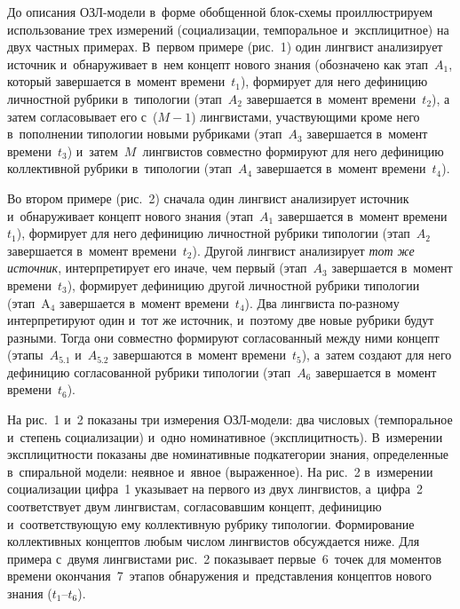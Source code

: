 {\begin{multicols}{2}
  До описания ОЗЛ-мо\-де\-ли в~форме обобщенной блок-схе\-мы 
проиллюстрируем использование трех измерений (социализации, темпоральное и~эксплицитное) на двух частных примерах. В~первом примере (рис.~1) один 
лингвист анализирует источник и~обнаруживает в~нем концепт нового знания 
(обозначено как этап~$A_1$, который завершается в~момент времени~$t_1$), 
формирует для него дефиницию личностной рубрики в~типологии (этап~$A_2$ 
завершается в~момент времени~$t_2$), а затем согласовывает его с~($M-1$) 
лингвистами, участвующими кроме него в~пополнении типологии новыми 
рубриками (этап~$A_3$ завершается в~момент времени~$t_3$) 
и~затем~$M$~лингвистов совместно формируют для него дефиницию 
коллективной рубрики в~типологии (этап~$A_4$ завершается в~момент 
времени~$t_4$).
  


  Во втором примере (рис.~2) сначала один лингвист анализирует источник 
и~обнаруживает концепт нового знания (этап~$A_1$ завершается в~момент 
времени~$t_1$), формирует для него дефиницию личностной рубрики 
типологии (этап~$A_2$ завершается в~момент времени~$t_2$). Другой лингвист 
анализирует \textit{тот же источник}, интерпретирует его иначе, чем первый 
(этап~$A_3$ завершается в~момент времени~$t_3$), формирует дефиницию другой 
личностной рубрики типологии (этап~A$_4$ завершается в~момент 
времени~$t_4$). Два лингвиста по-раз\-но\-му интерпретируют один и~тот же 
источник, и~поэтому две новые рубрики будут разными. Тогда они совместно 
формируют согласованный между ними концепт (этапы~$A_{5.1}$ и~$A_{5.2}$ 
завершаются в~момент времени~$t_5$), а~затем создают для него дефиницию 
согласованной рубрики типологии (этап~$A_6$ завершается в~момент 
времени~$t_6$).
  


  На рис.~1 и~2 показаны три измерения ОЗЛ-мо\-де\-ли: два числовых 
(темпоральное и~степень социализации) и~одно номинативное 
(эксплицитность). В~измерении эксплицитности показаны две номинативные 
подкатегории знания, определенные в~спиральной модели: неявное и~явное 
(выраженное). На рис.~2 в~измерении социализации цифра~1 указывает на 
первого из двух лингвистов, а~циф\-ра~2 соответствует двум лингвистам, 
согласовавшим концепт, дефиницию и~соответствующую ему коллективную 
рубрику типологии. Формирование коллективных концептов любым числом 
лингвистов обсуждается ниже. Для примера с~двумя лингвистами рис.~2 
показывает первые~6~точек для моментов времени окончания~7~этапов 
обнаружения и~представления концептов нового знания ($t_1$--$t_6$).


\end{multicols}}
